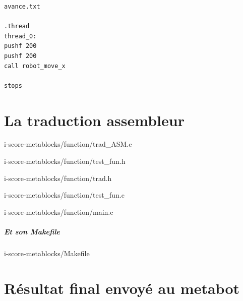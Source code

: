 \documentclass[10pt,a4paper]{report}
\begin{document}
\begin{appendices}
\begin{verbatim}
avance.txt

.thread
thread_0:
pushf 200
pushf 200
call robot_move_x

stops 
\end{verbatim}
\chapter{La traduction assembleur} 

{i-score-metablocks/function/trad_ASM.c}


{i-score-metablocks/function/test_fun.h}


{i-score-metablocks/function/trad.h}
\newpage

{i-score-metablocks/function/test_fun.c}


{i-score-metablocks/function/main.c}

\paragraph{Et son Makefile}

{i-score-metablocks/Makefile}

\chapter{Résultat final envoyé au metabot} 



\end{appendices} 
\end{document}
